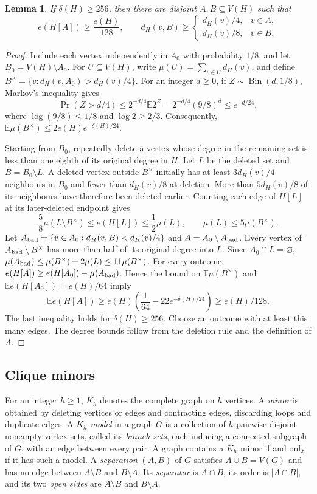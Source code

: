 \documentclass[10pt,letterpaper]{article}
\newtheorem{lemma}[theorem]{Lemma}
\theoremstyle{definition}
\theoremstyle{remark}
\begin{document}
\begin{lemma}\label{lem:reservoir}
If $\delta(H)\ge256$, then there are disjoint $A,B\subseteq V(H)$ such that
\[
e(H[A])\ge\frac{e(H)}{128},\qquad
 d_H(v,B)\ge
 \begin{cases}
 d_H(v)/4,&v\in A,\\
 d_H(v)/8,&v\in B.
 \end{cases}
\]
\end{lemma}
\begin{proof}
Include each vertex independently in $A_0$ with probability $1/8$, and let $B_0=V(H)\setminus A_0$. For $U\subseteq V(H)$, write $\mu(U)=\sum_{v\in U}d_H(v)$, and define $B^{\times}=\{v:d_H(v,A_0)>d_H(v)/4\}$. For an integer $d\ge0$, if $Z\sim\operatorname{Bin}(d,1/8)$, Markov's inequality gives
\[
\Pr(Z>d/4)\le2^{-d/4}\mathbb E2^Z
=2^{-d/4}(9/8)^d\le e^{-d/24},
\]
where $\log(9/8)\le1/8$ and $\log2\ge2/3$. Consequently, $\mathbb E\mu(B^{\times})\le2e(H)e^{-\delta(H)/24}$.

Starting from $B_0$, repeatedly delete a vertex whose degree in the remaining set is less than one eighth of its original degree in $H$. Let $L$ be the deleted set and $B=B_0\setminus L$. A deleted vertex outside $B^{\times}$ initially has at least $3d_H(v)/4$ neighbours in $B_0$ and fewer than $d_H(v)/8$ at deletion. More than $5d_H(v)/8$ of its neighbours have therefore been deleted earlier. Counting each edge of $H[L]$ at its later-deleted endpoint gives
\[
\frac58\mu(L\setminus B^{\times})\le e(H[L])\le\frac12\mu(L),
\qquad \mu(L)\le5\mu(B^{\times}).
\]
Let $A_{\rm bad}=\{v\in A_0:d_H(v,B)<d_H(v)/4\}$ and $A=A_0\setminus A_{\rm bad}$. Every vertex of $A_{\rm bad}\setminus B^{\times}$ has more than half of its original degree into $L$. Since $A_0\cap L=\varnothing$, $\mu(A_{\rm bad})\le\mu(B^{\times})+2\mu(L)\le11\mu(B^{\times})$. For every outcome, $e(H[A])\ge e(H[A_0])-\mu(A_{\rm bad})$. Hence the bound on $\mathbb E\mu(B^{\times})$ and $\mathbb E e(H[A_0])=e(H)/64$ imply
\[
\mathbb E e(H[A])\ge e(H)\left(\frac1{64}-22e^{-\delta(H)/24}\right)
\ge e(H)/128.
\]
The last inequality holds for $\delta(H)\ge256$. Choose an outcome with at least this many edges. The degree bounds follow from the deletion rule and the definition of $A$.
\end{proof}

\subsection{Clique minors}

For an integer $h\ge1$, $K_h$ denotes the complete graph on $h$ vertices. A \emph{minor} is obtained by deleting vertices or edges and contracting edges, discarding loops and duplicate edges. A \emph{$K_h$ model} in a graph $G$ is a collection of $h$ pairwise disjoint nonempty vertex sets, called its \emph{branch sets}, each inducing a connected subgraph of $G$, with an edge between every pair. A graph contains a $K_h$ minor if and only if it has such a model. A \emph{separation} $(A,B)$ of $G$ satisfies $A\cup B=V(G)$ and has no edge between $A\setminus B$ and $B\setminus A$. Its \emph{separator} is $A\cap B$, its order is $|A\cap B|$, and its two \emph{open sides} are $A\setminus B$ and $B\setminus A$.
\end{document}
